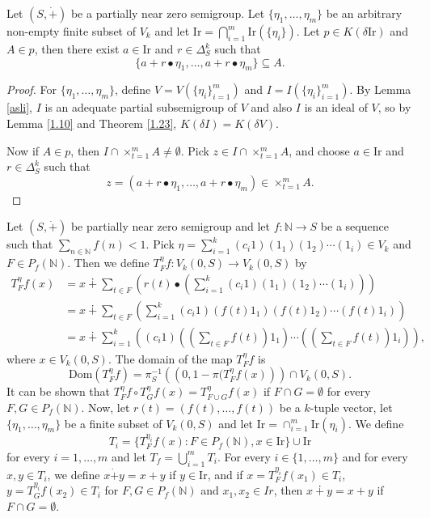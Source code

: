 \documentclass[twoside,11pt]{article}
\begin{document}
\begin{theorem}
	Let $(S,\dot{+})$ be a partially near zero semigroup. Let $\{\eta_1,\ldots,\eta_m\}$ be an arbitrary non-empty finite subset of $V_k$ and let $\mathrm{Ir} = \bigcap_{i=1}^m \mathrm{Ir}(\{\eta_i\})$. Let $p \in K(\delta \mathrm{Ir})$ and $A \in p$, then there exist \( a \in \mathrm{Ir} \) and \( r \in \Delta_S^k \) such that  
	\[
	\{ a + r \bullet \eta_1, \ldots, a + r \bullet \eta_m \} \subseteq A.
	\] 
\end{theorem}
\begin{proof}
	For $\{\eta_1,\ldots,\eta_m\}$, define $V = V(\{\eta_i\}_{i=1}^m)$ and $I = I(\{\eta_i\}_{i=1}^m)$. By Lemma \ref{asli}, $I$ is an adequate partial subsemigroup of $V$ and also $I$ is an ideal of $V$, so by Lemma \ref{1.10} and Theorem \ref{1.23}, $K(\delta I) = K(\delta V)$.
	
	Now if $A \in p$, then \( I \cap \times_{t=1}^{m} A \neq \emptyset \). Pick \( z \in I \cap \times_{t=1}^{m} A \), and choose \( a \in \mathrm{Ir} \) and \( r \in \Delta_S^k \) such that  
	\[
	z = \left( a + r \bullet \eta_1, \dots, a + r \bullet \eta_m \right) \in \times_{t=1}^{m} A.
	\] 
\end{proof}

Let $(S,\dot{+})$ be partially near zero semigroup and let $f:\mathbb{N}\to S$ be a sequence such that $\sum_{n\in\mathbb{N}}f(n)<1$. Pick $\eta = \sum_{i=1}^k (c_i1)(1_1)(1_2)\cdots(1_i) \in V_k$ and $F \in P_f(\mathbb{N})$. Then we define $T_F^{\eta}f:V_k(0,S)\to V_k(0,S)$ by
\begin{align*}
T_F^{\eta}f(x) &= x \dotplus \sum_{t\in F} \left( r(t) \bullet \left( \sum_{i=1}^k (c_i1)(1_1)(1_2)\cdots(1_i) \right) \right) \\
&= x \dotplus \sum_{t\in F} \left( \sum_{i=1}^k (c_i1)(f(t)1_1)(f(t)1_2)\cdots(f(t)1_i) \right) \\
&= x \dotplus \sum_{i=1}^k \left( (c_i1) \left( \left( \sum_{t\in F} f(t) \right) 1_1 \right) \cdots \left( \left( \sum_{t\in F} f(t) \right) 1_i \right) \right),
\end{align*}
where $x\in V_k(0,S)$. The domain of the map \( T_F^\eta f\) is
\[
\mathrm{Dom}(T_F^\eta f) = \pi_S^{-1}\left( \left(0, 1 - \pi ( T_F^\eta f(x) \right)\right) \cap V_k(0,S).
\]
It can be shown that $T_F^{\eta}f \circ T_G^{\eta}f(x) = T_{F \cup G}^{\eta}f(x)$ if $F \cap G = \emptyset$ for every $F,G \in P_f(\mathbb{N})$.
Now, let $r(t) = (f(t),\ldots,f(t))$ be a $k$-tuple vector, let $\{\eta_1,\ldots,\eta_m\}$ be a finite subset of $ V_k(0,S)$ and let $\mathrm{Ir} =\cap_{i=1}^m \mathrm{Ir} ({\eta}_i)$.
We define 
\[
T_i = \{ T_F^{\eta_i}f(x) : F \in P_f(\mathbb{N}), x \in \mathrm{Ir} \} \cup \mathrm{Ir}
\]
for every $i=1,\ldots,m$ and let $T_f = \bigcup_{i=1}^m T_i$. For every $i \in \{1,\ldots,m\}$ and for every $x,y\in T_i$, we define $x\dot{+}y=x+y$ if $y \in \mathrm{Ir}$, and if $x=T_F^{\eta_i}f(x_1)\in T_i$, $y=T_G^{\eta_i}f(x_2) \in T_i$ for $F,G\in P_f(\mathbb{N})$ and $x_1,x_2\in Ir$, then $x \dotplus y = x + y$ if $F \cap G = \emptyset$.
\end{document}
